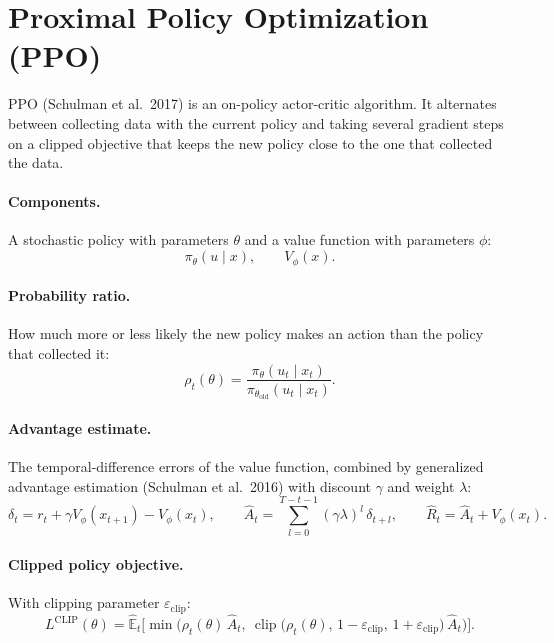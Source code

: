 \documentclass[11pt]{article}
\begin{document}
\appendix

\section{Proximal Policy Optimization (PPO)}
\label{app:ppo}

PPO (Schulman et al.\ 2017) is an on-policy actor-critic algorithm. It alternates between collecting
data with the current policy and taking several gradient steps on a clipped objective that keeps the
new policy close to the one that collected the data.

\paragraph{Components.} A stochastic policy with parameters $\theta$ and a value function with
parameters $\phi$:
\[
  \pi_\theta(u \mid x), \qquad V_\phi(x) .
\]

\paragraph{Probability ratio.} How much more or less likely the new policy makes an action than the
policy that collected it:
\[
  \rho_t(\theta) = \frac{\pi_\theta(u_t \mid x_t)}{\pi_{\theta_{\mathrm{old}}}(u_t \mid x_t)} .
\]

\paragraph{Advantage estimate.} The temporal-difference errors of the value function, combined by
generalized advantage estimation (Schulman et al.\ 2016) with discount $\gamma$ and weight $\lambda$:
\[
  \delta_t = r_t + \gamma V_\phi(x_{t+1}) - V_\phi(x_t), \qquad
  \hat A_t = \sum_{l=0}^{T - t - 1} (\gamma \lambda)^l\, \delta_{t+l}, \qquad
  \hat R_t = \hat A_t + V_\phi(x_t) .
\]

\paragraph{Clipped policy objective.} With clipping parameter $\varepsilon_{\mathrm{clip}}$:
\[
  L^{\mathrm{CLIP}}(\theta) = \hat{\mathbb{E}}_t\Big[\min\big(\rho_t(\theta)\, \hat A_t,\
  \operatorname{clip}\big(\rho_t(\theta),\, 1 - \varepsilon_{\mathrm{clip}},\,
  1 + \varepsilon_{\mathrm{clip}}\big)\, \hat A_t\big)\Big].
\]
\end{document}
